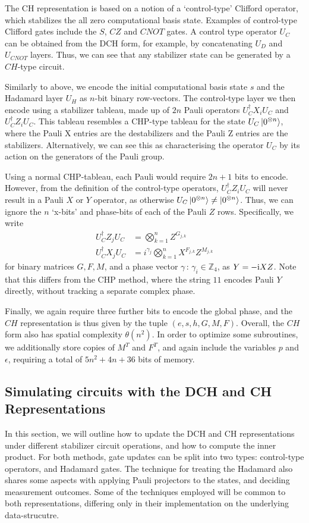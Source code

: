 The CH representation is based on a notion of a `control-type' Clifford operator, which stabilizes the all zero computational basis state. Examples of control-type Clifford gates include the $S$, $CZ$ and $CNOT$ gates. A control type operator $U_{C}$ can be obtained from the DCH form, for example, by concatenating $U_{D}$ and $U_{CNOT}$ layers. Thus, we can see that any stabilizer state can be generated by a $CH$-type circuit.\par
Similarly to above, we encode the initial computational basis state $s$ and the Hadamard layer $U_{H}$ as $n$-bit binary row-vectors. The control-type layer we then encode using a stabilizer tableau, made up of $2n$ Pauli operators
$U_{C}^{\dagger}X_{i}U_{C}$ and $U_{C}^{\dagger}Z_{i}U_{C}$. This tableau resembles a CHP-type tableau for the state $U_{C}\ket{0^{\otimes n}}$, where the Pauli X entries are the destabilizers and the Pauli Z entries are the stabilizers. Alternatively, we can see this as characterising the operator $U_{C}$ by its action on the generators of the Pauli group.\par
Using a normal CHP-tableau, each Pauli would require $2n+1$ bits to encode. However, from the definition of the control-type operators, $U_{C}^{\dagger}Z_{i}U_{C}$ will never result in a Pauli $X$ or $Y$ operator, as otherwise $U_{C}\ket{0^{\otimes n}}\neq\ket{0^{\otimes n}}$. Thus, we can ignore the $n$ `x-bits' and phase-bits of each of the Pauli $Z$ rows. Specifically, we write
\begin{align}
U_{C}^{\dagger}Z_{j}U_{C} &= \bigotimes_{k=1}^{n} Z^{G_{j,k}} \\
U_{C}^{\dagger}X_{j}U_{C} &= i^{\gamma_{j}}\bigotimes_{k=1}^{n}X^{F_{j,k}}Z^{M_{j,k}}
\end{align}
for binary matrices $G, F, M$, and a phase vector $\gamma\,:\,\gamma_{i}\in\mathbb{Z}_{4}$, as $Y=-\mathrm{i} XZ$. Note that this differs from the CHP method, where the string $11$ encodes Pauli $Y$ directly, without tracking a separate complex phase.\par
Finally, we again require three further bits to encode the global phase, and the $CH$ representation is thus given by the tuple $(e, s, h, G, M, F)$. Overall, the $CH$ form  also has spatial complexity $\theta(n^{2})$.  In order to optimize some subroutines, we additionally store copies of $M^{T}$ and $F^{T}$, and again include the variables $p$ and $\epsilon$,  requiring a total of $5n^{2}+4n+36$ bits of memory.
\subsection{Simulating circuits with the DCH and CH Representations}
In this section, we will outline how to update the DCH and CH representations under different stabilizer circuit operations, and how to compute the inner product. For both methods, gate updates can be split into two types: control-type operators, and Hadamard gates. The technique for treating the Hadamard also shares some aspects with applying Pauli projectors to the states, and deciding measurement outcomes. Some of the techniques employed will be common to both representations, differing only in their implementation on the underlying data-strucutre.
